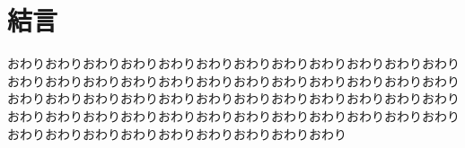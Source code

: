 \section{結言}

おわりおわりおわりおわりおわりおわりおわりおわりおわりおわりおわりおわりおわりおわりおわりおわりおわりおわりおわりおわりおわりおわりおわりおわりおわりおわりおわりおわりおわりおわりおわりおわりおわりおわりおわりおわりおわりおわりおわりおわりおわりおわりおわりおわりおわりおわりおわりおわりおわりおわりおわりおわりおわりおわりおわりおわりおわり